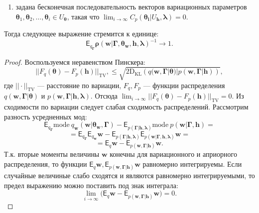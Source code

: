 \begin{theorem}
\begin{enumerate}
\item задана  бесконечная последовательность векторов вариационных параметров $\boldsymbol{\theta}_1,\boldsymbol{\theta}_2,\dots, \boldsymbol{\theta}_i \in U_{\boldsymbol{\theta}}$, такая что $\lim_{i \to \infty}C_p(\boldsymbol{\theta_i}|U_{\mathbf{h}}, \boldsymbol{\lambda}) = 0.$ 

\end{enumerate}
Тогда следующее выражение стремится к единице:
\[
   \mathsf{E}_{q_{\boldsymbol{\Gamma}}} \boldsymbol{\rho}(\mathbf{w}|\boldsymbol{\Gamma}, \boldsymbol{\theta}_\mathbf{w}, \mathbf{h},\boldsymbol{\lambda})^{-1} \to 1.
\]


\end{theorem}

\begin{proof}
Воспользуемся неравенством Пинскера:
\[
    ||F_q(\boldsymbol{\theta})-F_p(\mathbf{h})||_\text{TV},\leq\sqrt{2\text{D}_\text{KL}\left(q(\mathbf{w}, \boldsymbol{\Gamma}|\boldsymbol{\theta})|p(\mathbf{w}, \boldsymbol{\Gamma}|\mathbf{h})\right)},
\]
где $||\cdot||_\text{TV}$ --- расстояние по вариации, $F_q, F_p$ --- функции распределения   $q(\mathbf{w},\boldsymbol{\Gamma}|\boldsymbol{\theta})$ и $p(\mathbf{w},\boldsymbol{\Gamma}| \mathbf{h}, \boldsymbol{\lambda})$.
Отсюда $ \lim_{i \to \infty} ||F_q(\boldsymbol{\theta})-F_p(\mathbf{h})||_\text{TV} = 0.$
Из сходимости по вариации следует слабая сходимость распределений.
Рассмотрим разность усредненных мод:
\[
\mathsf{E}_{q_{\boldsymbol{\Gamma}}}\text{mode}~q_{\mathbf{w}}(\mathbf{w}|\boldsymbol{\theta}_\mathbf{w},\boldsymbol{\Gamma})-\mathsf{E}_{p(\boldsymbol{\Gamma}|\mathbf{h}, \boldsymbol{\lambda})} \text{mode}~p(\mathbf{w}|\boldsymbol{\Gamma}, \mathbf{h}) = 
\]
\[
=\mathsf{E}_{q_{\boldsymbol{\Gamma}}} \mathsf{E}_{q_\mathbf{w}} \mathbf{w}-\mathsf{E}_{p(\boldsymbol{\Gamma}|\mathbf{h}, \boldsymbol{\lambda})} \mathsf{E}_{p(\mathbf{w}| \boldsymbol{\Gamma}, \mathbf{h}, \boldsymbol{\lambda})} \mathbf{w} =
\]
\[
= \mathsf{E}_{q}\mathbf{w}-\mathsf{E}_{p(\mathbf{w},\boldsymbol{\Gamma}|\mathbf{h})}\mathbf{w}.
\]
Т.к. вторые моменты величины $\mathbf{w}$ конечны для вариационного и априорного распределения, то функции $\mathsf{E}_{q}\mathbf{w}, \mathsf{E}_{p(\mathbf{w},\boldsymbol{\Gamma}| \mathbf{h})}\mathbf{w}$ равномерно интегрируемы. Если случайные величиные слабо сходятся и являются равномерно интегрируемыми, то предел выражению можно поставить под знак интеграла:
\[
  \lim_{i \to \infty}\bigl( \mathsf{E}_{q}\mathbf{w}- \mathsf{E}_{p(\mathbf{w},\boldsymbol{\Gamma}|\mathbf{h})}\mathbf{w} \bigr) = 0.
\]
\end{proof}
